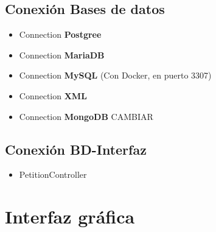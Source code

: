 \documentclass[12pt,a4paper]{article}
\begin{document}
\subsection{Conexión Bases de datos} \label{pto61}

\begin{itemize}

\item Connection \textbf{Postgree} \label{pto611}

 
 \item Connection \textbf{MariaDB} \label{pto612}


\item Connection \textbf{MySQL} (Con Docker, en puerto 3307) \label{pto613}


\item Connection \textbf{XML} \label{pto614}


\item Connection \textbf{MongoDB} CAMBIAR \label{pto615}

\end{itemize}
\subsection{Conexión BD-Interfaz} \label{pto62}
\begin{itemize}
\item PetitionController \label{pto621}

\end{itemize}







\newpage
\section{Interfaz gráfica} \label{pto7}
\end{document}
